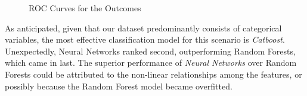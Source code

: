 \begin{figure}[H]%
    \caption{ROC Curves for the Outcomes}%
    \label{fig:roc_curve}%
    \centering
    \qquad
     \qquad
\end{figure}

As anticipated, given that our dataset predominantly consists of categorical 
variables, the most effective classification model for this scenario is 
\emph{Catboost}. Unexpectedly, Neural Networks ranked second, outperforming
Random Forests, which came in last. The superior performance of
\emph{Neural Networks} over Random Forests could be attributed to the non-linear 
relationships among the features, or possibly because the Random Forest model 
became overfitted.

